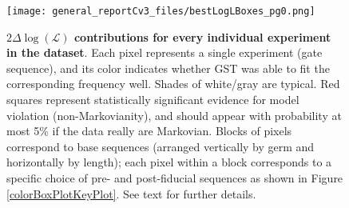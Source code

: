 \documentclass{article}[11pt]
\begin{document}
{\begin{figure}
\begin{center}
\texttt{[image: general\_reportCv3\_files/bestLogLBoxes\_pg0.png]}
\caption{\textbf{$2\Delta\log(\mathcal{L})$ contributions for every individual experiment in the dataset}.   Each pixel represents a single experiment (gate sequence), and its color indicates whether GST was able to fit the corresponding frequency well.  Shades of white/gray are typical. Red squares represent statistically significant evidence for model violation (non-Markovianity), and should appear with probability at most 5\% if the data really are Markovian. Blocks of pixels correspond to base sequences (arranged vertically by germ and horizontally by length); each pixel within a block corresponds to a specific choice of pre- and post-fiducial sequences as shown in Figure \ref{colorBoxPlotKeyPlot}.  See text for further details.\label{bestEstimateColorBoxPlot}}
\end{center}
\end{figure}

%

}{}
\end{document}
